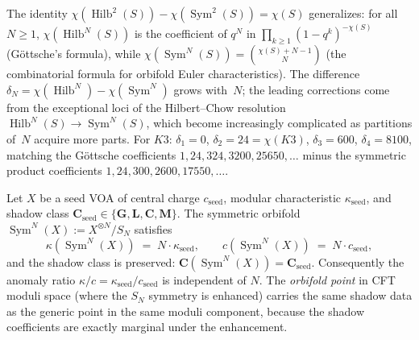 \begin{remark}
\label{rem:hilbert-chow-higher}
The identity
$\chi(\operatorname{Hilb}^2(S)) - \chi(\operatorname{Sym}^2(S))
= \chi(S)$ generalizes: for all $N \geq 1$,
$\chi(\operatorname{Hilb}^N(S))$ is the coefficient of $q^N$ in
$\prod_{k \geq 1}(1-q^k)^{-\chi(S)}$ (G\"ottsche's formula),
while $\chi(\operatorname{Sym}^N(S))
= \binom{\chi(S) + N - 1}{N}$ (the combinatorial formula for
orbifold Euler characteristics). The difference
$\delta_N = \chi(\operatorname{Hilb}^N) -
\chi(\operatorname{Sym}^N)$ grows with~$N$; the leading
corrections come from the exceptional loci of the Hilbert--Chow
resolution $\operatorname{Hilb}^N(S) \to \operatorname{Sym}^N(S)$,
which become increasingly complicated as partitions of~$N$ acquire
more parts. For $K3$: $\delta_1 = 0$, $\delta_2 = 24 = \chi(K3)$,
$\delta_3 = 600$, $\delta_4 = 8100$, matching the G\"ottsche
coefficients $1, 24, 324, 3200, 25650, \ldots$ minus the
symmetric product coefficients
$1, 24, 300, 2600, 17550, \ldots$.
\end{remark}

\begin{conjecture}
\ClaimStatusConjectured
\label{conj:orbifold-point-agreement}
Let $X$ be a seed VOA of central charge $c_{\mathrm{seed}}$,
modular characteristic $\kappa_{\mathrm{seed}}$, and shadow
class $\mathbf{C}_{\mathrm{seed}} \in \{\mathbf{G},
\mathbf{L}, \mathbf{C}, \mathbf{M}\}$. The symmetric
orbifold $\operatorname{Sym}^N(X) :=
X^{\otimes N}/S_N$ satisfies
\[
 \kappa(\operatorname{Sym}^N(X))
 \;=\; N \cdot \kappa_{\mathrm{seed}},
 \qquad
 c(\operatorname{Sym}^N(X))
 \;=\; N \cdot c_{\mathrm{seed}},
\]
and the shadow class is preserved:
$\mathbf{C}(\operatorname{Sym}^N(X)) =
\mathbf{C}_{\mathrm{seed}}$. Consequently the anomaly ratio
$\kappa/c = \kappa_{\mathrm{seed}}/c_{\mathrm{seed}}$ is
independent of $N$. The \emph{orbifold point} in CFT moduli
space (where the $S_N$ symmetry is enhanced) carries the
same shadow data as the generic point in the same moduli
component, because the shadow coefficients are exactly
marginal under the enhancement.
\end{conjecture}

